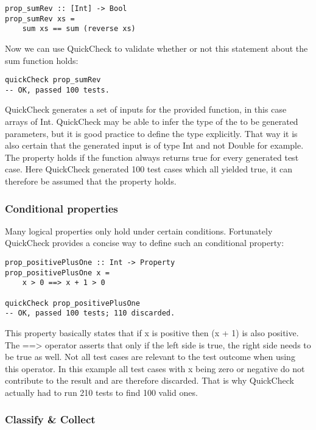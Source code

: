 \documentclass[a4paper, 12pt]{article} %
\begin{document}
\begin{verbatim}
prop_sumRev :: [Int] -> Bool
prop_sumRev xs = 
    sum xs == sum (reverse xs)
\end{verbatim}

Now we can use QuickCheck to validate whether or not this statement about the sum function holds:

\begin{verbatim}
quickCheck prop_sumRev
-- OK, passed 100 tests.
\end{verbatim}

QuickCheck generates a set of inputs for the provided function, in this case arrays of Int. QuickCheck may be able to infer the type of the to be generated parameters, but it is good practice to define the type explicitly. That way it is also certain that the generated input is of type Int and not Double for example. The property holds if the function always returns true for every generated test case. \cite{Claessen2000} Here QuickCheck generated 100 test cases which all yielded true, it can therefore be assumed that the property holds.

\subsubsection{Conditional properties}

Many logical properties only hold under certain conditions. Fortunately QuickCheck provides a concise way to define such an conditional property:

\begin{verbatim}
prop_positivePlusOne :: Int -> Property
prop_positivePlusOne x = 
    x > 0 ==> x + 1 > 0

quickCheck prop_positivePlusOne  
-- OK, passed 100 tests; 110 discarded.
\end{verbatim}

This property basically states that if x is positive then (x + 1) is also positive. The ==\textgreater{} operator asserts that only if the left side is true, the right side needs to be true as well. \cite{Claessen2000} Not all test cases are relevant to the test outcome when using this operator. In this example all test cases with x being zero or negative do not contribute to the result and are therefore discarded. That is why QuickCheck actually had to run 210 tests to find 100 valid ones.  

\subsubsection{Classify \& Collect}
\end{document}
